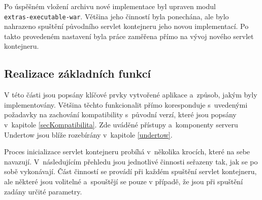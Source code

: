             Po úspěšném vložení archivu nové implementace byl upraven modul \\\texttt{extras-executable-war}.
            Většina jeho činností byla ponechána, ale bylo nahrazeno spuštění původního servlet kontejneru
            jeho novou implementací. Po takto provedeném nastavení byla práce zaměřena přímo na vývoj
            nového servlet kontejneru. 

        


        \subsection{Realizace základních funkcí}
            V této části jsou popsány klíčové prvky vytvořené aplikace a~způsob, jakým byly implementovány. Většina těchto
            funkcionalit přímo koresponduje s~uvedenými požadavky na zachování kompatibility s~původní verzí, 
            které jsou popsány v~kapitole \ref{secKompatibilita}.
            Zde uváděné přístupy a~komponenty serveru Undertow jsou blíže rozebírány v~kapitole \ref{undertow}.

            Proces inicializace servlet kontejneru probíhá v~několika krocích, které na sebe
            navazují. V~následujícím přehledu jsou jednotlivé činnosti seřazeny tak, jak
            se po sobě vykonávají. 
            Část činností se provádí při každém spuštění servlet kontejneru,
            ale některé jsou volitelné a~spouštějí se pouze v případě, že jsou při spuštění
            zadány určité parametry. 

